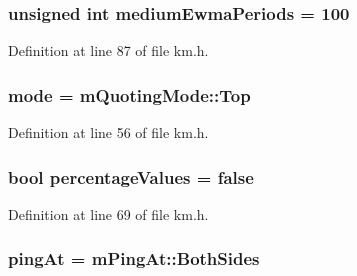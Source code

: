 \subsubsection[{\texorpdfstring{medium\+Ewma\+Periods}{mediumEwmaPeriods}}]{\setlength{\rightskip}{0pt plus 5cm}unsigned int medium\+Ewma\+Periods = 100}\hypertarget{struct_k_1_1m_quoting_params_af0d97776d733257c7f697f39d80962d9}{}\label{struct_k_1_1m_quoting_params_af0d97776d733257c7f697f39d80962d9}


Definition at line 87 of file km.\+h.

\subsubsection[{\texorpdfstring{mode}{mode}}]{ mode = {\bf m\+Quoting\+Mode\+::\+Top}}\hypertarget{struct_k_1_1m_quoting_params_aba9219e91199409f90646b018b900dc6}{}\label{struct_k_1_1m_quoting_params_aba9219e91199409f90646b018b900dc6}


Definition at line 56 of file km.\+h.

\subsubsection[{\texorpdfstring{percentage\+Values}{percentageValues}}]{\setlength{\rightskip}{0pt plus 5cm}bool percentage\+Values = false}\hypertarget{struct_k_1_1m_quoting_params_ac8404ecb555d84d2bef12ffae8b401b6}{}\label{struct_k_1_1m_quoting_params_ac8404ecb555d84d2bef12ffae8b401b6}


Definition at line 69 of file km.\+h.

\subsubsection[{\texorpdfstring{ping\+At}{pingAt}}]{ ping\+At = {\bf m\+Ping\+At\+::\+Both\+Sides}}\hypertarget{struct_k_1_1m_quoting_params_afb778f21e472d73bf86c2cf855cd4720}{}\label{struct_k_1_1m_quoting_params_afb778f21e472d73bf86c2cf855cd4720}


